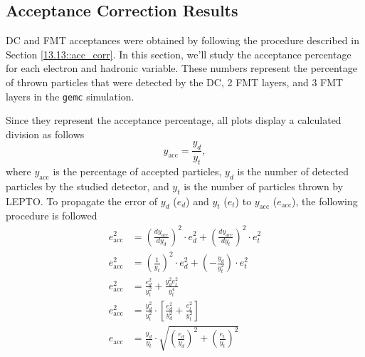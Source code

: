\subsection{Acceptance Correction Results}
\label{14.20::acceptance_correction_results}
    DC and FMT acceptances were obtained by following the procedure described in Section \ref{13.13::acc_corr}.
    In this section, we'll study the acceptance percentage for each electron and hadronic variable.
    These numbers represent the percentage of thrown particles that were detected by the DC, 2 FMT layers, and 3 FMT layers in the \texttt{gemc} simulation.

    Since they represent the acceptance percentage, all plots display a calculated division as follows
    \begin{equation*}
        y_\text{acc} = \frac{y_d}{y_t},
    \end{equation*}
    where $y_\text{acc}$ is the percentage of accepted particles, $y_d$ is the number of detected particles by the studied detector, and $y_t$ is the number of particles thrown by LEPTO.
    To propagate the error of $y_d$ ($e_d$) and $y_t$ ($e_t$) to $y_\text{acc}$ ($e_\text{acc}$), the following procedure is followed
    \begin{align}
        \nonumber e_\text{acc}^2 &=
            \left(\frac{dy_\text{acc}}{dy_d}\right)^2 \cdot e_d^2 +
            \left(\frac{dy_\text{acc}}{dy_t}\right)^2 \cdot e_t^2
            \\
        \nonumber e_\text{acc}^2 &=
            \left(\frac{1}{y_t}\right)^2 \cdot e_d^2 +
            \left(-\frac{y_d}{y_t^2}\right) \cdot e_t^2
            \\
        \nonumber e_\text{acc}^2 &=
            \frac{e_d^2}{y_t^2} + \frac{y_d^2 e_t^2}{y_t^4}
            \\
        \nonumber e_\text{acc}^2 &=
            \frac{y_d^2}{y_t^2} \cdot \left[
                \frac{e_d^2}{y_d^2} + \frac{e_t^2}{y_t^2}
            \right]
            \\
        e_\text{acc} &=
            \frac{y_d}{y_t} \cdot \sqrt{
                \left(\frac{e_d}{y_d}\right)^2 + \left(\frac{e_t}{y_t}\right)^2
            }
        \label{eq::14.20::acc_error}
    \end{align}

    
    
